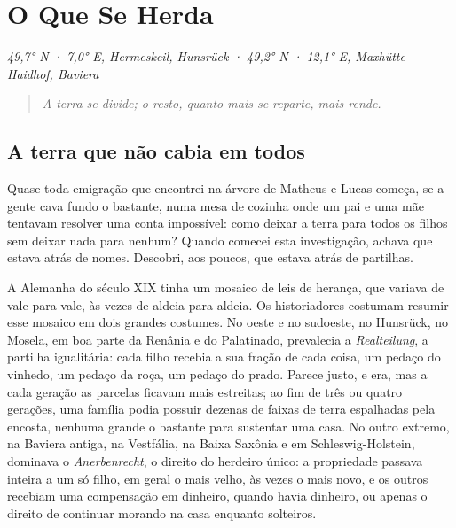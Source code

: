 \documentclass[
  brazilian,
  11pt,
  openany]{book}
\begin{document}
\chapter{O Que Se Herda}\label{cap-15}

\emph{49,7° N · 7,0° E, Hermeskeil, Hunsrück · 49,2° N · 12,1° E,
Maxhütte-Haidhof, Baviera}

\begin{quote}
\emph{A terra se divide; o resto, quanto mais se reparte, mais rende.}
\end{quote}

\section{A terra que não cabia em
todos}\label{a-terra-que-nuxe3o-cabia-em-todos}

Quase toda emigração que encontrei na árvore de Matheus e Lucas começa,
se a gente cava fundo o bastante, numa mesa de cozinha onde um pai e uma
mãe tentavam resolver uma conta impossível: como deixar a terra para
todos os filhos sem deixar nada para nenhum? Quando comecei esta
investigação, achava que estava atrás de nomes. Descobri, aos poucos,
que estava atrás de partilhas.

A Alemanha do século XIX tinha um mosaico de leis de herança, que
variava de vale para vale, às vezes de aldeia para aldeia. Os
historiadores costumam resumir esse mosaico em dois grandes costumes. No
oeste e no sudoeste, no Hunsrück, no Mosela, em boa parte da Renânia e
do Palatinado, prevalecia a \emph{Realteilung}, a partilha igualitária:
cada filho recebia a sua fração de cada coisa, um pedaço do vinhedo, um
pedaço da roça, um pedaço do prado. Parece justo, e era, mas a cada
geração as parcelas ficavam mais estreitas; ao fim de três ou quatro
gerações, uma família podia possuir dezenas de faixas de terra
espalhadas pela encosta, nenhuma grande o bastante para sustentar uma
casa. No outro extremo, na Baviera antiga, na Vestfália, na Baixa
Saxônia e em Schleswig-Holstein, dominava o \emph{Anerbenrecht}, o
direito do herdeiro único: a propriedade passava inteira a um só filho,
em geral o mais velho, às vezes o mais novo, e os outros recebiam uma
compensação em dinheiro, quando havia dinheiro, ou apenas o direito de
continuar morando na casa enquanto solteiros.
\end{document}
